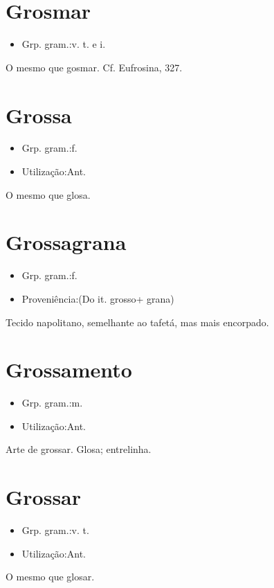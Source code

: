 \section{Grosmar}
\begin{itemize}
\item {Grp. gram.:v. t.  e  i.}
\end{itemize}
O mesmo que \textunderscore gosmar\textunderscore . Cf. \textunderscore Eufrosina\textunderscore , 327.
\section{Grossa}
\begin{itemize}
\item {Grp. gram.:f.}
\end{itemize}
\begin{itemize}
\item {Utilização:Ant.}
\end{itemize}
O mesmo que \textunderscore glosa\textunderscore .
\section{Grossagrana}
\begin{itemize}
\item {Grp. gram.:f.}
\end{itemize}
\begin{itemize}
\item {Proveniência:(Do it. \textunderscore grosso\textunderscore  + \textunderscore grana\textunderscore )}
\end{itemize}
Tecido napolitano, semelhante ao tafetá, mas mais encorpado.
\section{Grossamento}
\begin{itemize}
\item {Grp. gram.:m.}
\end{itemize}
\begin{itemize}
\item {Utilização:Ant.}
\end{itemize}
Arte de grossar.
Glosa; entrelinha.
\section{Grossar}
\begin{itemize}
\item {Grp. gram.:v. t.}
\end{itemize}
\begin{itemize}
\item {Utilização:Ant.}
\end{itemize}
O mesmo que \textunderscore glosar\textunderscore .
